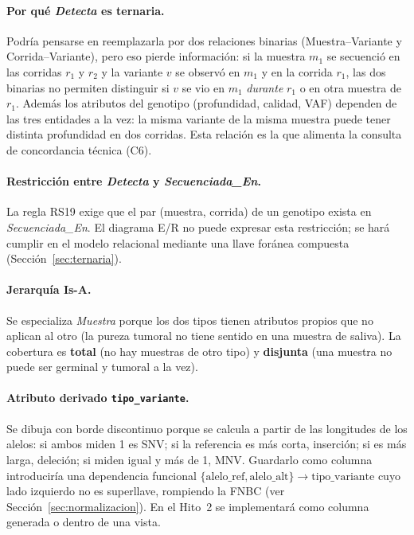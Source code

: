 \documentclass[11pt,a4paper]{article}
\newcommand{\tb}[1]{\texttt{#1}}
\begin{document}
\paragraph{Por qué \emph{Detecta} es ternaria.} Podría pensarse en reemplazarla por dos relaciones binarias (Muestra--Variante y Corrida--Variante), pero eso pierde información: si la muestra $m_1$ se secuenció en las corridas $r_1$ y $r_2$ y la variante $v$ se observó en $m_1$ y en la corrida $r_1$, las dos binarias no permiten distinguir si $v$ se vio en $m_1$ \emph{durante} $r_1$ o en otra muestra de $r_1$. Además los atributos del genotipo (profundidad, calidad, VAF) dependen de las tres entidades a la vez: la misma variante de la misma muestra puede tener distinta profundidad en dos corridas. Esta relación es la que alimenta la consulta de concordancia técnica (C6).

\paragraph{Restricción entre \emph{Detecta} y \emph{Secuenciada\_En}.} La regla RS19 exige que el par (muestra, corrida) de un genotipo exista en \emph{Secuenciada\_En}. El diagrama E/R no puede expresar esta restricción; se hará cumplir en el modelo relacional mediante una llave foránea compuesta (Sección~\ref{sec:ternaria}).

\paragraph{Jerarquía Is-A.} Se especializa \emph{Muestra} porque los dos tipos tienen atributos propios que no aplican al otro (la pureza tumoral no tiene sentido en una muestra de saliva). La cobertura es \textbf{total} (no hay muestras de otro tipo) y \textbf{disjunta} (una muestra no puede ser germinal y tumoral a la vez).

\paragraph{Atributo derivado \tb{tipo\_variante}.} Se dibuja con borde discontinuo porque se calcula a partir de las longitudes de los alelos: si ambos miden 1 es SNV; si la referencia es más corta, inserción; si es más larga, deleción; si miden igual y más de 1, MNV. Guardarlo como columna introduciría una dependencia funcional $\{\text{alelo\_ref}, \text{alelo\_alt}\} \rightarrow \text{tipo\_variante}$ cuyo lado izquierdo no es superllave, rompiendo la FNBC (ver Sección~\ref{sec:normalizacion}). En el Hito~2 se implementará como columna generada o dentro de una vista.
\end{document}
